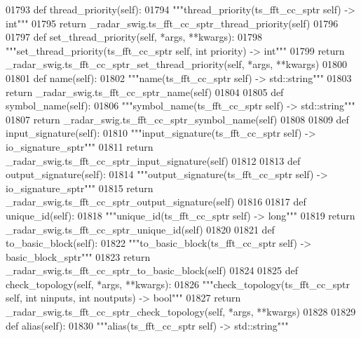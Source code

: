 \begin{DoxyCode}
{{{{{{{01793     \textcolor{keyword}{def }thread_priority(self):
01794         \textcolor{stringliteral}{"""thread\_priority(ts\_fft\_cc\_sptr self) -> int"""}
01795         \textcolor{keywordflow}{return} \_radar\_swig.ts\_fft\_cc\_sptr\_thread\_priority(self)
01796 
01797     \textcolor{keyword}{def }set_thread_priority(self, *args, **kwargs):
01798         \textcolor{stringliteral}{"""set\_thread\_priority(ts\_fft\_cc\_sptr self, int priority) -> int"""}
01799         \textcolor{keywordflow}{return} \_radar\_swig.ts\_fft\_cc\_sptr\_set\_thread\_priority(self, *args, **kwargs)
01800 
01801     \textcolor{keyword}{def }name(self):
01802         \textcolor{stringliteral}{"""name(ts\_fft\_cc\_sptr self) -> std::string"""}
01803         \textcolor{keywordflow}{return} \_radar\_swig.ts\_fft\_cc\_sptr\_name(self)
01804 
01805     \textcolor{keyword}{def }symbol_name(self):
01806         \textcolor{stringliteral}{"""symbol\_name(ts\_fft\_cc\_sptr self) -> std::string"""}
01807         \textcolor{keywordflow}{return} \_radar\_swig.ts\_fft\_cc\_sptr\_symbol\_name(self)
01808 
01809     \textcolor{keyword}{def }input_signature(self):
01810         \textcolor{stringliteral}{"""input\_signature(ts\_fft\_cc\_sptr self) -> io\_signature\_sptr"""}
01811         \textcolor{keywordflow}{return} \_radar\_swig.ts\_fft\_cc\_sptr\_input\_signature(self)
01812 
01813     \textcolor{keyword}{def }output_signature(self):
01814         \textcolor{stringliteral}{"""output\_signature(ts\_fft\_cc\_sptr self) -> io\_signature\_sptr"""}
01815         \textcolor{keywordflow}{return} \_radar\_swig.ts\_fft\_cc\_sptr\_output\_signature(self)
01816 
01817     \textcolor{keyword}{def }unique_id(self):
01818         \textcolor{stringliteral}{"""unique\_id(ts\_fft\_cc\_sptr self) -> long"""}
01819         \textcolor{keywordflow}{return} \_radar\_swig.ts\_fft\_cc\_sptr\_unique\_id(self)
01820 
01821     \textcolor{keyword}{def }to_basic_block(self):
01822         \textcolor{stringliteral}{"""to\_basic\_block(ts\_fft\_cc\_sptr self) -> basic\_block\_sptr"""}
01823         \textcolor{keywordflow}{return} \_radar\_swig.ts\_fft\_cc\_sptr\_to\_basic\_block(self)
01824 
01825     \textcolor{keyword}{def }check_topology(self, *args, **kwargs):
01826         \textcolor{stringliteral}{"""check\_topology(ts\_fft\_cc\_sptr self, int ninputs, int noutputs) -> bool"""}
01827         \textcolor{keywordflow}{return} \_radar\_swig.ts\_fft\_cc\_sptr\_check\_topology(self, *args, **kwargs)
01828 
01829     \textcolor{keyword}{def }alias(self):
01830         \textcolor{stringliteral}{"""alias(ts\_fft\_cc\_sptr self) -> std::string"""}
}}}}}}}
\end{DoxyCode}
